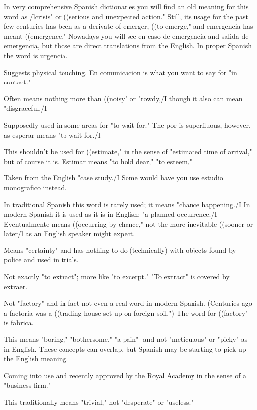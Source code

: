 In very comprehensive Spanish dictionaries
you will find an old meaning for this word as /lcrisis" or ((serious and
unexpected action." Still, its usage for the past few centuries has been
as a derivate of emerger, ((to emerge," and emergencia has meant
((emergence." Nowadays you will see en caso de emergencia and salida de emergencia, but those are direct translations from the English.
In proper Spanish the word is urgencia.

 Suggests physical touching. En comunicacion
is what you want to say for "in contact."

 Often means nothing more than ((noisy" or
"rowdy,/I though it also can mean "disgraceful./I

 Supposedly used in some areas for "to wait
for." The por is superfluous, however, as esperar means "to wait for./I

 This shouldn't be used for ((estimate," in the sense
of "estimated time of arrival," but of course it is. Estimar means "to
hold dear," "to esteem,"

 Taken from the English "case study./I
Some would have you use estudio monografico instead.

 In traditional Spanish this word is rarely used; it
means "chance happening./I In modern Spanish it is used as it is in
English: "a planned occurrence./I Eventualmente means ((occurring
by chance," not the more inevitable ((sooner or later/l as an English
speaker might expect.

 Means "certainty" and has nothing to do (technically) with objects found by police and used in trials.

 Not exactly "to extract"; more like "to excerpt."
"To extract" is covered by extraer.

 Not "factory" and in fact not even a real word in
modern Spanish. (Centuries ago a factoria was a ((trading house set up
on foreign soil.") The word for ((factory" is fabrica.

 This means "boring," "bothersome," "a pain"-
and not "meticulous" or "picky" as in English. These concepts can
overlap, but Spanish may be starting to pick up the English meaning.

 Coming into use and recently approved by the Royal
Academy in the sense of a "business firm."

 This traditionally means "trivial," not "desperate" or
"useless."

